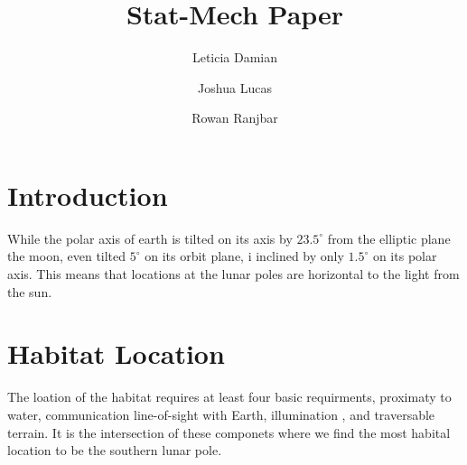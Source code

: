 \documentclass[prl,twocolumn]{revtex4-1}  %
\begin{document}

\title{ Stat-Mech Paper }
\author{Leticia Damian }
\author{Joshua Lucas}
\author{Rowan Ranjbar}







\begin{abstract}

\end{abstract}
 

\maketitle %

\section{Introduction}

While the polar axis of earth is tilted on its axis by $23.5^{\circ}$ from the elliptic plane the moon, even tilted $5^{\circ}$ on its orbit plane, i inclined by only $1.5^{\circ}$ on its polar axis\citep{Koebel}. This means that locations at the lunar poles are horizontal to the light from the sun. 

\section{Habitat Location}
The loation of the habitat requires at least four basic requirments, proximaty to water, communication line-of-sight with Earth, illumination , and traversable terrain. It is the intersection of these componets where we find the most habital location to be the southern lunar pole.
\end{document}
